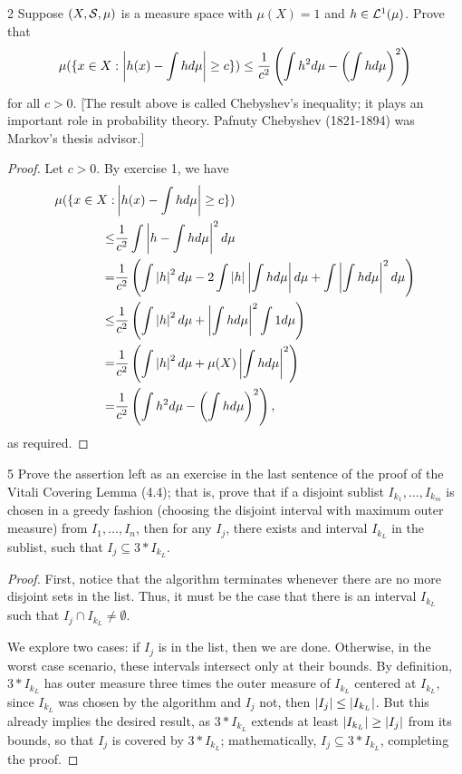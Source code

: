 \begin{exercise}{2}
Suppose $(X, \mathcal{S}, \mu)$ is a measure space with $\mu(X) = 1$ and $h \in \mathcal{L}^1(\mu)$.
Prove that
\begin{align*}
    \mu(\{x \in X: \left\lvert h(x) - \int h d\mu\right\rvert \geq c\}) 
    \leq \frac{1}{c^2} \left( \int h^2 d\mu - \left( \int h d\mu\right)^2\right)
\end{align*}
for all $c > 0$.
[The result above is called Chebyshev's inequality;
it plays an important role in probability theory.
Pafnuty Chebyshev (1821-1894) was Markov's thesis advisor.]
\end{exercise}
\begin{proof}
Let $c > 0$.
By exercise 1, we have
\begin{align*}
    \mu(\{x \in X:& \left\lvert h(x) - \int h d\mu\right\rvert \geq c\})\\ 
    \leq& \frac{1}{c^2} \int \left\lvert h - \int h d\mu\right\rvert^2 d\mu\\
    =& \frac{1}{c^2} \left( \int \left\lvert h\right\rvert^2 d\mu 
        - 2\int \left\lvert h\right\rvert\left\lvert \int h d\mu\right\rvert d\mu 
        + \int \left\lvert \int h d\mu\right\rvert^2 d\mu\right)\\
    \leq& \frac{1}{c^2} \left( \int \left\lvert h\right\rvert^2 d\mu 
        + \left\lvert \int h d\mu\right\rvert^2 \int 1 d\mu\right)\\
    =& \frac{1}{c^2} \left( \int \left\lvert h\right\rvert^2 d\mu
        + \mu(X) \left\lvert \int h d\mu\right\rvert^2\right)\\
    =& \frac{1}{c^2} \left( \int h^2 d\mu - \left( \int h d\mu\right)^2\right),
\end{align*}
as required.
\end{proof} 

\begin{exercise}{5}
Prove the assertion left as an exercise in the last sentence of the proof of the Vitali Covering Lemma (4.4);
that is, prove that if a disjoint sublist $I_{k_1}, \dots, I_{k_m}$ is chosen in a greedy fashion (choosing the disjoint interval with maximum outer measure) from $I_1, \dots, I_n$, then for any $I_j$, there exists and interval $I_{k_L}$ in the sublist, such that $I_j \subseteq 3 \ast I_{k_L}$.
\end{exercise}
\begin{proof}
First, notice that the algorithm terminates whenever there are no more disjoint sets in the list.
Thus, it must be the case that there is an interval $I_{k_L}$ such that $I_j \cap I_{k_L} \neq \emptyset$.

We explore two cases:
if $I_j$ is in the list, then we are done.
Otherwise, in the worst case scenario, these intervals intersect only at their bounds.
By definition, $3 \ast I_{k_L}$ has outer measure three times the outer measure of $I_{k_L}$ centered at $I_{k_L}$, since $I_{k_L}$ was chosen by the algorithm and $I_j$ not, then $\left\lvert I_j\right\rvert \leq \left\lvert I_{k_L}\right\rvert$.
But this already implies the desired result, as $3 \ast I_{k_L}$ extends at least $\left\lvert I_{k_L}\right\rvert \geq \left\lvert I_j\right\rvert$ from its bounds, so that $I_j$ is covered by $3 \ast I_{k_L}$;
mathematically, $I_j \subseteq 3 \ast I_{k_L}$, completing the proof.
\end{proof} 


